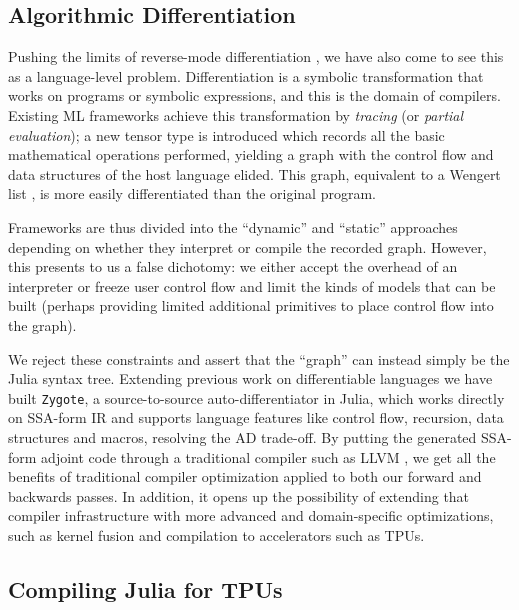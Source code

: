 \documentclass{juliacon}
\begin{document}
\subsection{Algorithmic Differentiation}
\label{zygote}

Pushing the limits of reverse-mode differentiation \cite{speelpenning1980compiling}, we have also come to see this as a language-level problem. Differentiation is a symbolic transformation that works on programs or symbolic expressions, and this is the domain of compilers. Existing ML frameworks achieve this transformation by \textit{tracing} (or \textit{partial evaluation}); a new tensor type is introduced which records all the basic mathematical operations performed, yielding a graph with the control flow and data structures of the host language elided. This graph, equivalent to a Wengert list \cite{bartholomew2000automatic}, is more easily differentiated than the original program.

Frameworks are thus divided into the ``dynamic'' and ``static'' approaches \cite{neubig2017dynet} depending on whether they interpret \cite{maclaurin2015autograd} or compile \cite{bergstra2011theano} the recorded graph. However, this presents to us a false dichotomy: we either accept the overhead of an interpreter or freeze user control flow and limit the kinds of models that can be built (perhaps providing limited additional primitives to place control flow into the graph).

We reject these constraints and assert that the ``graph'' can instead  simply be the Julia syntax tree.  Extending previous work on differentiable languages \cite{pearlmutter2008reverse} we have built \texttt{Zygote}, a source-to-source auto-differentiator in Julia, which works directly on SSA-form IR and supports language features like control flow, recursion, data structures and macros, resolving the AD trade-off. By putting the generated SSA-form adjoint code through a traditional compiler such as LLVM \cite{lattner2004llvm}, we get all the benefits of traditional compiler optimization applied to both our forward and backwards passes. In addition, it opens up the possibility of extending that compiler infrastructure with more advanced and domain-specific optimizations, such as kernel fusion and compilation to accelerators such as TPUs.

\subsection{Compiling Julia for TPUs}
\label{tpu}
\end{document}
